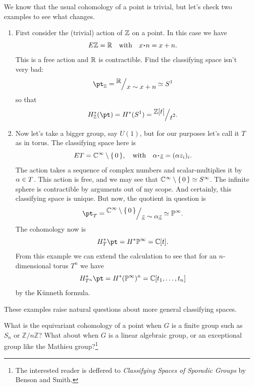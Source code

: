 \documentclass[12pt]{memoir}
\begin{document}
\begin{Ex}\label{ex:equiv-cohom-point}
We know that the usual cohomology of a point is trivial, but let's check two examples to see what changes.
\begin{enumerate}
    \item First consider the (trivial) action of $\mathbb{Z}$ on a point. In this case we have
    $$E\bZ=\bR\word{with}x\.n=x+n.$$
    This is a free action and $\mathbb{R}$ is contractible. Find the classifying space isn't very bad:
    $$\pt_\bZ=\quot{\bR}{x\sim x+n}\isom S^1$$
    so that 
    $$H_\bZ^\ast(\pt)=H^\ast(S^1)=\quot{\bZ[t]}{t^2}.$$
    \item Now let's take a bigger group, say $U(1)$, but for our purposes let's call it $T$ as in torus. The classifying space here is 
    $$ET=\bC^\infty\less\set{0},\word{with}\al\.\un{z}=(\al z_i)_i.$$
    The action takes a sequence of complex numbers and scalar-multiplies it by $\alpha\in T$. 
    This action is free, and we may see that $\mathbb{C}^\infty\setminus\{\,0\,\}\simeq S^\infty$. The infinite sphere is contractible by arguments out of my scope. And certainly, this classifying space is unique. But now, the quotient in question is 
    $$\pt_T=\quot{\bC^\infty\less\set{0}}{\un{z}\sim \al\un{z}}\isom\bP^\infty.$$
    The cohomology now is 
    $$H^\ast_{T}\pt=H^\ast\bP^\infty=\bC[t].$$
    From this example we can extend the calculation to see that for an $n$-dimensional torus $T^n$ we have 
    $$H^\ast_{T^n}\pt=H^\ast(\bP^\infty)^n=\bC[t_1,\dots,t_n]$$
    by the K\"unneth formula.
\end{enumerate}
\end{Ex}

These examples raise natural questions about more general classifying spaces.

\begin{Qn}
What is the equivariant cohomology of a point when $G$ is a finite group such as $S_n$ or $\mathbb{Z}/n\mathbb{Z}$? What about when $G$ is a linear algebraic group, or an exceptional group like the Mathieu group?\footnote{The interested reader is deffered to \emph{Classifying Spaces of Sporadic Groups} by Benson and Smith.}
\end{Qn}
\end{document}
